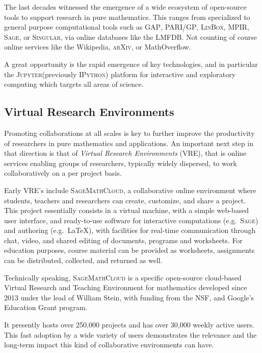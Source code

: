 \documentclass{llncs}
\newcommand{\software}[1]{\textsc{#1}\xspace}
\newcommand{\GAP}{\software{GAP}}
\newcommand{\Singular}{\software{Singular}}
\newcommand{\Sage}{\software{Sage}}
\newcommand{\IPython}{\software{IPython}}
\newcommand{\Jupyter}{\software{Jupyter}}
\newcommand{\PariGP}{\software{PARI/GP}}
\newcommand{\Linbox}{\software{LinBox}}
\newcommand{\LMFDB}{\software{LMFDB}}
\newcommand{\SMC}{\software{SageMathCloud}}
\newcommand{\MPIR}{\software{MPIR}}
\newcommand{\Arxiv}{\software{arXiv}}
\begin{document}
The last decades witnessed the emergence of a wide ecosystem of
open-source tools to support research in pure mathematics. This ranges
from specialized to general purpose computational tools such as \GAP,
\PariGP, \Linbox, \MPIR, \Sage, or \Singular, via online databases
like the \LMFDB. Not counting of course online services like the
Wikipedia, \Arxiv, or MathOverflow.

A great opportunity is the rapid emergence of key technologies, and in
particular the \Jupyter (previously \IPython) platform for interactive
and exploratory computing which targets all areas of science.

\subsection{Virtual Research Environments}

Promoting collaborations at all scales is key to further improve the
productivity of researchers in pure mathematics and applications. An
important next step in that direction is that of \emph{Virtual
Research Environments} (VRE), that is online services enabling
groups of researchers, typically widely dispersed, to work
collaboratively on a per project basis.

Early VRE's include \SMC, a collaborative online environment
where students, teachers and researchers can create, customize, and
share a project. This project essentially consists in a virtual
machine, with a simple web-based user interface, and ready-to-use
software for interactive computations (e.g.\ \Sage) and authoring
(e.g.\ \LaTeX), with facilities for real-time communication through
chat, video, and shared editing of documents, programs and worksheets.
For education purposes, course material can be provided as worksheets,
assignments can be distributed, collected, and returned as well.

Technically speaking, \SMC is a specific open-source cloud-based
Virtual Research and Teaching Environment for mathematics developed
since 2013 under the lead of William Stein, with funding from the NSF,
and Google's Education Grant program.

It presently hosts over 250,000 projects and has over 30,000 weekly active
users. This fast adoption by a wide variety of users demonstrates the
relevance and the long-term impact this kind of collaborative
environments can have.
\end{document}

